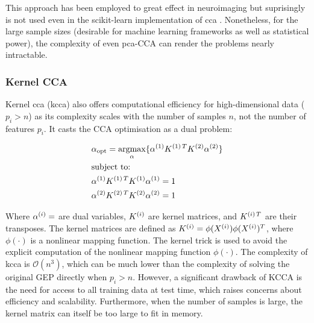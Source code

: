 This approach has been employed to great effect in neuroimaging but suprisingly is not used even in the scikit-learn implementation of \acrshort{cca} \citep{pedregosa2011scikit}.
Nonetheless, for the large sample sizes (desirable for machine learning frameworks as well as statistical power), the complexity of even \acrshort{pca}-CCA can render the problems nearly intractable.

\subsubsection{Kernel CCA}

Kernel \acrshort{cca} (\acrshort{kcca}) also offers computational efficiency for high-dimensional data (\(p_i>n\)) as its complexity scales with the number of samples \(n\), not the number of features \(p_i\)\citep{akaho2006kernel}.
It casts the CCA optimisation as a dual problem:

\begin{align}
    & \alpha_{\text{opt}}=\underset{\alpha}{\mathrm{argmax}}\{ \alpha^{(1)}K^{(1)\,T}K^{(2)}\alpha^{(2)}  \} \\
    & \text{subject to:} \notag                                                                                            \\
    & \alpha^{(1)}K^{(1)\,T}K^{(1)}\alpha^{(1)}=1 \notag                                                                  \\
    & \alpha^{(2)}K^{(2)\,T}K^{(2)}\alpha^{(2)}=1 \notag
\end{align}

Where \(\alpha^{(i)}=\) are dual variables, \(K^{(i)}\) are kernel matrices, and \(K^{(i)\,T}\) are their transposes.
The kernel matrices are defined as \(K^{(i)}=\phi(X^{(i)})\phi(X^{(i)})^T\), where \(\phi(\cdot)\) is a nonlinear mapping function.
The kernel trick is used to avoid the explicit computation of the nonlinear mapping function \(\phi(\cdot)\).
The complexity of \acrshort{kcca} is \(\mathcal{O}(n^3)\), which can be much lower than the complexity of solving the original GEP directly when \(p_i>n\).
However, a significant drawback of KCCA is the need for access to all training data at test time, which raises concerns about efficiency and scalability.
Furthermore, when the number of samples is large, the kernel matrix can itself be too large to fit in memory.

